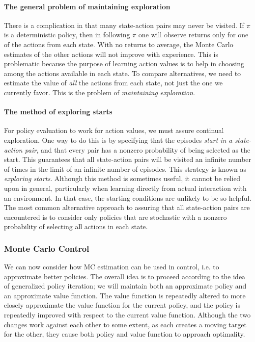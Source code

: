 \documentclass[12pt]{article}
\begin{document}
\paragraph{The general problem of maintaining exploration} There is a complication in that many state-action pairs may never be visited. If $\pi$ is a deterministic policy, then in following $\pi$ one will observe returns only for one of the actions from each state. With no returns to average, the Monte Carlo estimates of the other actions will not improve with experience. This is problematic because the purpose of learning action values is to help in choosing among the actions available in each state. To compare alternatives, we need to estimate the value of \emph{all} the actions from each state, not just the one we currently favor. This is the problem of \emph{maintaining exploration}.

\paragraph{The method of exploring starts}
For policy evaluation to work for action values, we must assure continual exploration. One way to do this is by specifying that the episodes \emph{start in a state-action pair}, and that every pair has a nonzero probability of being selected as the start. This guarantees that all state-action pairs will be visited an infinite number of times in the limit of an infinite number of episodes. This strategy is known as \emph{exploring starts}. Although this method is sometimes useful, it cannot be relied upon in general, particularly when learning directly from actual interaction with an environment. In that case, the starting conditions are unlikely to be so helpful. The most common alternative approach to assuring that all state-action pairs are encountered is to consider only policies that are stochastic with a nonzero probability of selecting all actions in each state.
\subsubsection{Monte Carlo Control}
We can now consider how MC estimation can be used in control, i.e. to approximate better policies. The overall idea is to proceed according to the idea of generalized policy iteration; we will maintain both an approximate policy and an approximate value function. The value function is repeatedly altered to more closely approximate the value function for the current policy, and the policy is repeatedly improved with respect to the current value function. Although the two changes work against each other to some extent, as each creates a moving target for the other, they cause both policy and value function to approach optimality.
\end{document}
